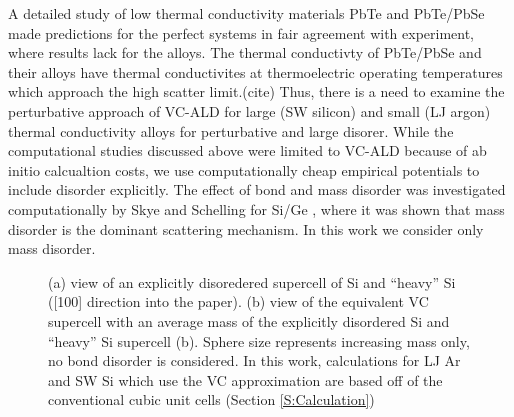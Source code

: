 \documentclass[aps,prb,onecolumn,preprint,superscriptaddress,amsmath,amssymb,floatfix]{revtex4}
\begin{document}
A detailed study of low thermal conductivity materials 
PbTe\cite{shiga_microscopic_2012} and PbTe/PbSe\cite{tian_phonon_2012} 
made predictions for the perfect systems in fair agreement with 
experiment, where results lack for the alloys. The thermal conductivty 
of PbTe/PbSe and their alloys have thermal conductivites at thermoelectric 
operating temperatures which approach the high scatter limit.(cite) 
Thus, there is a need to examine the perturbative approach of 
VC-ALD for large (SW silicon) and small (LJ argon) 
thermal conductivity alloys for perturbative and large disorer. 
While the computational studies discussed above were limited to VC-ALD 
because of ab initio calcualtion costs, we use computationally 
cheap empirical potentials to include disorder explicitly. 
The effect of bond and mass disorder was investigated computationally 
by Skye and 
Schelling for Si/Ge \cite{skye_thermal_2008}, 
where it was shown that mass disorder is 
the dominant scattering mechanism. In this work we consider only 
mass disorder.

% 

\begin{figure}
\begin{center}
\mbox{}
\vspace*{0mm}
\end{center}
\caption{\label{F:supercells} 
(a) view of an explicitly disoredered supercell of 
Si and ``heavy'' Si ([100] direction into the paper).
\cite{momma_vesta:_2008} 
(b) view of the equivalent VC supercell 
with an average
mass of the explicitly disordered Si and ``heavy'' Si supercell 
(b). 
Sphere size represents 
increasing mass 
only, no bond disorder is considered. 
In this work, calculations for LJ Ar and SW Si which use the VC 
approximation 
are based off of the conventional cubic unit cells 
(Section \ref{S:Calculation}) 
}
\end{figure}
\end{document}
